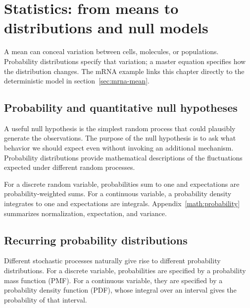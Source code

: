 \clearpage
\section{Statistics: from means to distributions and null models}
\label{sec:statistics}
A mean can conceal variation between cells, molecules, or populations.
Probability distributions specify that variation; a master equation specifies how the distribution changes.
The mRNA example links this chapter directly to the deterministic model in section~\ref{sec:mrna-mean}.
\subsection{Probability and quantitative null hypotheses}
\label{sec:null}



A useful null hypothesis is the simplest random process that could plausibly generate the observations.
The purpose of the null hypothesis is to ask what behavior we should expect even without invoking an additional mechanism.
Probability distributions provide mathematical descriptions of the fluctuations expected under different random processes.


For a discrete random variable, probabilities sum to one and expectations are probability-weighted sums.
For a continuous variable, a probability density integrates to one and expectations are integrals.
Appendix~\ref{math:probability} summarizes normalization, expectation, and variance.
\subsection{Recurring probability distributions}
\label{sec:distributions}


Different stochastic processes naturally give rise to different probability distributions.
For a discrete variable, probabilities are specified by a probability mass function (PMF).
For a continuous variable, they are specified by a probability density function (PDF), whose integral over an interval gives the probability of that interval.

